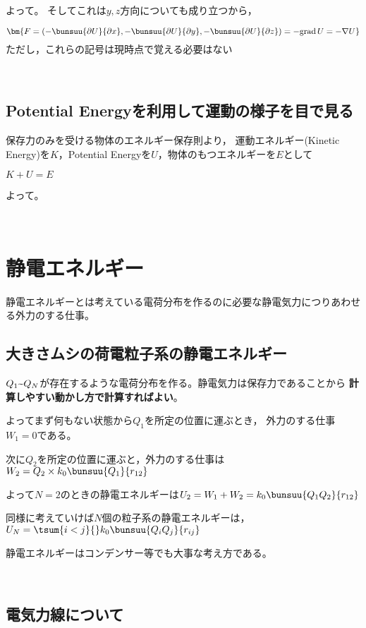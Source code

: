    よって。
   そしてこれは$y, z$方向についても成り立つから，

   $$\bm{F=\left(-\bunsuu{\partial U}{\partial x}, -\bunsuu{\partial U}{\partial y},-\bunsuu{\partial U}{\partial z}\right)=-\mathrm{grad}\,U=-\nabla U}$$
   ただし，これらの記号は現時点で覚える必要はない

   ﻿\subsection{Potential Energyを利用して運動の様子を目で見る}

   保存力のみを受ける物体のエネルギー保存則より，
   運動エネルギー(Kinetic Energy)を$K$，Potential Energyを$U$，物体のもつエネルギーを$E$として

   $K+U=E$

   よって。

   ﻿\section{静電エネルギー}

   静電エネルギーとは考えている電荷分布を作るのに必要な静電気力につりあわせる外力のする仕事。

  \subsection{大きさムシの荷電粒子系の静電エネルギー}

  $Q_1\text\textasciitilde Q_N$が存在するような電荷分布を作る。静電気力は保存力であることから
  {\bfseries 計算しやすい動かし方で計算すればよい}。

  よってまず何もない状態から$Q_1$を所定の位置に運ぶとき，
  外力のする仕事$W_1=0$である。

  次に$Q_2$を所定の位置に運ぶと，外力のする仕事は$W_2=Q_2\times k_0\bunsuu{Q_1}{r_{12}}$

  よって$N=2$のときの静電エネルギーは$U_2=W_1+W_2=k_0\bunsuu{Q_1Q_2}{r_{12}}$

  同様に考えていけば$N$個の粒子系の静電エネルギーは，$U_N=\tsum{i<j}{}k_0\bunsuu{Q_iQ_j}{r_{ij}}$

  静電エネルギーはコンデンサー等でも大事な考え方である。

  ﻿\subsection{電気力線について}



